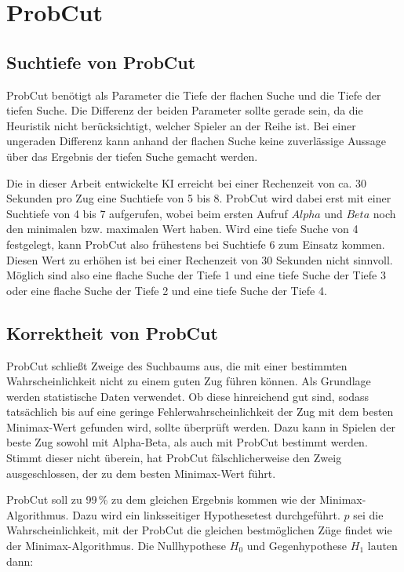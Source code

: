 
\section{ProbCut}

\subsection{Suchtiefe von ProbCut}
ProbCut benötigt als Parameter die Tiefe der flachen Suche und die Tiefe der tiefen Suche. Die Differenz der beiden
Parameter sollte gerade sein, da die Heuristik nicht berücksichtigt, welcher Spieler an der Reihe ist. Bei einer
ungeraden Differenz kann anhand der flachen Suche keine zuverlässige Aussage über das Ergebnis der tiefen Suche gemacht
werden.

Die in dieser Arbeit entwickelte \ac{KI} erreicht bei einer Rechenzeit von ca. 30 Sekunden pro Zug eine Suchtiefe von 5 bis
8. ProbCut wird dabei erst mit einer Suchtiefe von 4 bis 7 aufgerufen, wobei beim ersten Aufruf $Alpha$ und $Beta$ noch
den minimalen bzw. maximalen Wert haben. Wird eine tiefe Suche von 4 festgelegt, kann ProbCut also frühestens bei
Suchtiefe 6 zum Einsatz kommen. Diesen Wert zu erhöhen ist bei einer Rechenzeit von 30 Sekunden nicht sinnvoll. Möglich
sind also eine flache Suche der Tiefe 1 und eine tiefe Suche der Tiefe 3 oder eine flache Suche der Tiefe 2 und eine
tiefe Suche der Tiefe 4.

\subsection{Korrektheit von ProbCut}
ProbCut schließt Zweige des Suchbaums aus, die mit einer bestimmten Wahrscheinlichkeit nicht zu einem guten Zug führen
können. Als Grundlage werden statistische Daten verwendet. Ob diese hinreichend gut sind, sodass tatsächlich bis auf
eine geringe Fehlerwahrscheinlichkeit der Zug mit dem besten Minimax-Wert gefunden wird, sollte überprüft werden. Dazu
kann in Spielen der beste Zug sowohl mit Alpha-Beta, als auch mit ProbCut bestimmt werden. Stimmt dieser nicht überein,
hat ProbCut fälschlicherweise den Zweig ausgeschlossen, der zu dem besten Minimax-Wert führt.

ProbCut soll zu 99\,\% zu dem gleichen Ergebnis kommen wie der Minimax-Algorithmus. Dazu wird ein linksseitiger
Hypothesetest durchgeführt. $p$ sei die Wahrscheinlichkeit, mit der ProbCut die gleichen bestmöglichen Züge findet wie
der Minimax-Algorithmus. Die Nullhypothese $H_0$ und Gegenhypothese $H_1$ lauten dann:

